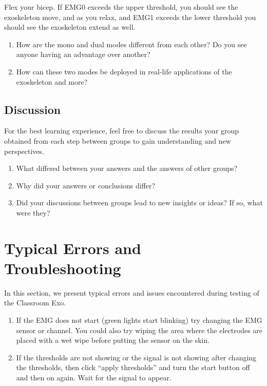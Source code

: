 Flex your bicep. If  EMG0 exceeds the upper threshold, you should see the exoskeleton move, and as you relax, and EMG1 exceeds the lower threshold you should see the exoskeleton extend as well. 
\begin{enumerate}[]
	\item How are the mono and dual modes different from each other? Do you see anyone having an advantage over another? 
	\item How can these two modes be deployed in real-life applications of the exoskeleton and more? 
\end{enumerate}
 
\subsection{Discussion}
For the best learning experience, feel free to discuss the results your group obtained from each step between groups to gain understanding and new perspectives.

\begin{enumerate}[]
	\item What differed between your answers and the answers of other groups?
	\item Why did your answers or conclusions differ?
	\item Did your discussions between groups lead to new insights or ideas? If so, what were they?
\end{enumerate}

\section{Typical Errors and Troubleshooting}
In this section, we present typical errors and issues encountered during testing of the Classroom Exo.


\begin{enumerate}[]
	\item If the EMG does not start (green lights start blinking) try changing the EMG sensor or channel. You could also try wiping the area where the electrodes are placed with a wet wipe before putting the sensor on the skin. 
	\item If the thresholds are not showing or the signal is not showing after changing the thresholds, then click “apply thresholds” and turn the start button off and then on again. Wait for the signal to appear. 
	
\end{enumerate}	
	 
